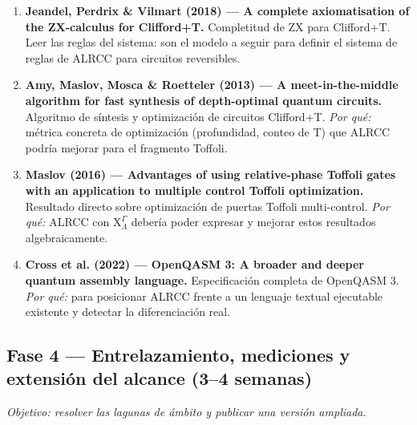 \documentclass[12pt, a4paper]{article}
\newcommand{\gate}[1]{\text{#1}}
\newcommand{\stategate}[3]{\gate{#1}^{#2}_{#3}}
\begin{document}
\begin{enumerate}[resume]
  \item \textbf{Jeandel, Perdrix \& Vilmart (2018) --- A complete axiomatisation of the ZX-calculus for Clifford+T.}
        Completitud de ZX para Clifford+T. Leer las reglas del sistema: son el
        modelo a seguir para definir el sistema de reglas de ALRCC para
        circuitos reversibles.

  \item \textbf{Amy, Maslov, Mosca \& Roetteler (2013) --- A meet-in-the-middle algorithm for fast synthesis of depth-optimal quantum circuits.}
        Algoritmo de síntesis y optimización de circuitos Clifford+T.
        \textit{Por qué:} métrica concreta de optimización (profundidad,
        conteo de T) que ALRCC podría mejorar para el fragmento Toffoli.

  \item \textbf{Maslov (2016) --- Advantages of using relative-phase Toffoli gates with an application to multiple control Toffoli optimization.}
        Resultado directo sobre optimización de puertas Toffoli multi-control.
        \textit{Por qué:} ALRCC con $\stategate{X}{\Gamma}{\Lambda}$ debería
        poder expresar y mejorar estos resultados algebraicamente.

  \item \textbf{Cross et al. (2022) --- OpenQASM 3: A broader and deeper quantum assembly language.}
        Especificación completa de OpenQASM 3.
        \textit{Por qué:} para posicionar ALRCC frente a un lenguaje textual
        ejecutable existente y detectar la diferenciación real.
\end{enumerate}

\subsection*{Fase 4 --- Entrelazamiento, mediciones y extensión del alcance (3--4 semanas)}

\textit{Objetivo: resolver las lagunas de ámbito y publicar una versión ampliada.}
\end{document}
